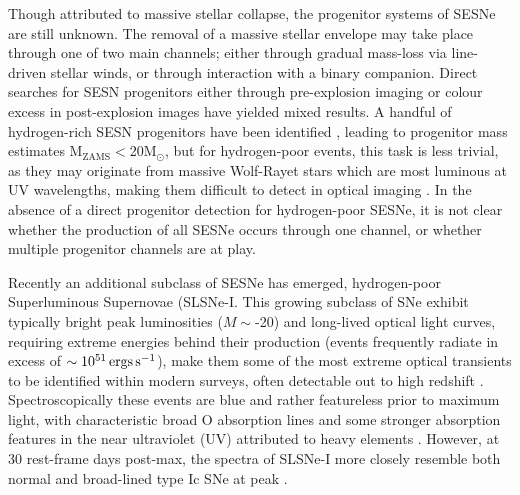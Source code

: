\documentclass[a4paper,fleqn,usenatbib]{mnras}
\newcommand{\angus}[1]{\color{JungleGreen}#1\color{black}}
\begin{document}
Though attributed to massive stellar collapse, the progenitor systems of SESNe are still unknown. The removal of a massive stellar envelope may take place through one of two main channels; either through gradual mass-loss via line-driven stellar winds, or through interaction with a binary companion. Direct searches for SESN progenitors either through pre-explosion imaging or colour excess in post-explosion images have yielded mixed results. A handful of hydrogen-rich SESN progenitors have been identified {\angus{{(e.g. SN 1993J, SN 2008ax, SN2011dh, SN2013df and SN2016gkg (Aldering et al. 1994; Smartt 2009,Crockett et al. 2008; Arcavi et al. 2011; Folatelli et al. 2015,Maund et al. 2011, Van Dyk et al. 2014, Kilpatrick et al. 2017; Tartaglia et al. 2017)}}}, leading to progenitor mass estimates M$_{\mathrm{ZAMS}}<$20M$_{\odot}$, but for hydrogen-poor events, this task is less trivial, as they may originate from massive Wolf-Rayet stars which are most luminous at UV wavelengths, making them difficult to detect in optical imaging {\angus{{(Smartt 2009; Eldridge et al. 2013)}}}. In the absence of a direct progenitor detection for hydrogen-poor SESNe, it is not clear whether the production of all SESNe occurs through one channel, or whether multiple progenitor channels are at play.

Recently an additional subclass of SESNe has emerged, hydrogen-poor Superluminous Supernovae (SLSNe-I. This growing subclass of SNe exhibit typically bright peak luminosities ($M\sim$-20) and long-lived optical light curves, requiring extreme energies behind their production (events frequently radiate in excess of $\sim10^{51}\,{\rm ergs\,s^{-1}}$), make them some of the most extreme optical transients to be identified within modern surveys, often detectable out to high redshift \citep{Pan2017,Smith2017}. Spectroscopically these events are blue
and rather featureless prior to maximum light, with characteristic broad O absorption lines {\angus{{Quimby et al. 2011}}} and some stronger absorption features in the near ultraviolet (UV) attributed to heavy elements {\angus{{(see more detailed discussion in Quimby et al. 2018)}}}. However, at 30 rest-frame days post-max, the spectra of SLSNe-I more closely resemble both normal and broad-lined type Ic SNe at peak {\angus{{(Pastorello et al. 2010; Liu et al. 2017)}}}.
\end{document}
